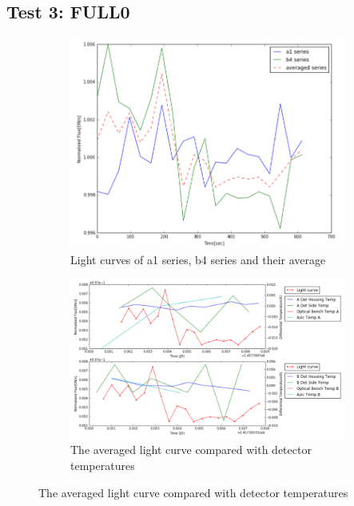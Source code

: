 \documentclass[conference]{IEEEtran}
\begin{document}
\subsection{Test 3: FULL0} 
\begin{figure}[H]
    \centering
    \begin{subfigure}{1}
        \includegraphics[scale=0.4]{ts_test3}
        \caption{Light curves of a1 series, b4 series and their average}
    \end{subfigure}

    \begin{subfigure}{2}
        \includegraphics[scale=0.4]{temp_test3}
        \caption{The averaged light curve compared with detector temperatures}
    \end{subfigure}
   

\end{figure}
\end{document}
